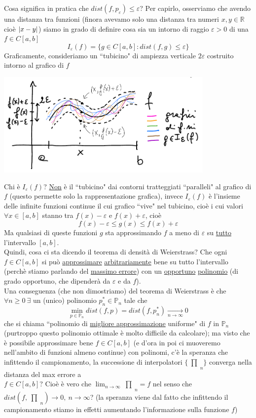 \documentclass[12pt,headings=optiontohead]{article}
\DeclarePairedDelimiter{\abs}{\lvert}{\rvert}
\newcommand{\inter}{\begin{matrix}\prod\end{matrix}}
\begin{document}
Cosa significa in pratica che $dist(f,p_{\varepsilon}) \le \varepsilon$? Per capirlo, osserviamo che avendo una distanza tra funzioni (finora avevamo solo una distanza tra numeri $x,y \in \mathbb{R}$ cioè $\abs{x-y}$) siamo in grado di definire cosa sia un intorno
di raggio $\varepsilon >0$ di una $f\in C[a,b]$
\[ I_{\varepsilon}(f) = \{g \in C[a,b] : dist(f,g) \le \varepsilon\} \]
Graficamente, consideriamo un ``tubicino" di ampiezza verticale $2\varepsilon$ costruito intorno al grafico di $f$
\begin{center}
    \includegraphics[width=0.8\textwidth]{lez12_img3.png}
\end{center}
Chi è $I_{\varepsilon}(f)$? \uline{Non} è il ``tubicino" dai contorni tratteggiati ``paralleli" al grafico di $f$ (questo permette solo
la rappresentazione grafica), invece $I_{\varepsilon}(f)$ è l'insieme delle infinite funzioni continue il cui grafico ``vive" nel tubicino, cioè i cui valori $\forall x \in [a,b]$ stanno tra $f(x)-\varepsilon$ e $f(x)+\varepsilon$, cioè 
\[ f(x)-\varepsilon \le g(x) \le f(x)+\varepsilon \]
Ma qualsiasi di queste funzioni $g$ sta approssimando $f$ a meno di $\varepsilon$ su \uline{tutto} l'intervallo $[a,b]$.\\
Quindi, cosa ci sta dicendo il teorema di densità di Weierstrass? Che ogni $f \in C[a,b]$ si può \uline{approssimare} \uline{arbitrariamente} bene
su tutto l'intervallo (perchè stiamo parlando del \uline{massimo errore}) con un \uline{opportuno} \uline{polinomio} (di grado opportuno, che dipenderà da $\varepsilon$ e da $f$).\\
Una conseguenza (che non dimostriamo) del teorema di Weierstrass è che $\forall n\ge0\ \exists$ un (unico) polinomio $p_n^* \in \mathbb{P}_n$ tale che
\[ \min_{p \in \mathbb{P}_n} dist(f,p) = dist(f,p_n^*) \underset{n \to \infty}{\longrightarrow} 0 \]
che si chiama ``polinomio di \uline{migliore approssimazione} uniforme" di $f$ in $\mathbb{P}_n$ (purtroppo questo polinomio ottimale
è molto difficile da calcolare); ma visto che è possibile approssimare bene $f \in C[a,b]$ (e d'ora in poi ci muoveremo nell'ambito di funzioni almeno continue) con polinomi, c'è la speranza che infittendo il campionamento, la successione di interpolatori $\{\inter_n\}$ converga nella distanza del max errore a \\$f \in C[a,b]$? Cioè è vero che $\lim_{n \to \infty} \inter_n = f$ nel senso che $dist(f,\inter_n) \to 0,\ n \to \infty$? (la speranza viene dal fatto che infittendo il campionamento stiamo in effetti aumentando l'informazione sulla funzione $f$)\\
\end{document}
